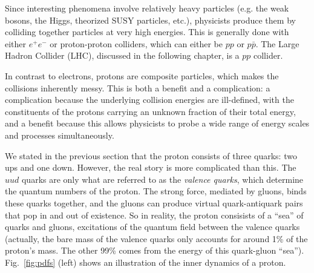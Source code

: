 Since interesting phenomena involve relatively heavy particles (e.g. the weak bosons,
the Higgs, theorized SUSY particles, etc.), physicists produce them by colliding together
particles at very high energies. This is generally done with either $e^+ e^-$ or proton-proton
colliders, which can either be $pp$ or $p\bar{p}$. The Large Hadron Collider (LHC), discussed in the following
chapter, is a $pp$ collider. 

In contrast to electrons, protons are composite particles, which makes the
collisions inherently messy. This is both a benefit and a complication: a complication because
the underlying collision energies are ill-defined, with the constituents of the protons carrying
an unknown fraction of their total energy, and a benefit because this allows physicists to probe
a wide range of energy scales and processes simultaneously.

We stated in the previous section that the proton consists of three quarks: two ups and one down.
However, the real story is more complicated than this. The $uud$ quarks are only what are referred
to as the \textit{valence quarks}, which determine the quantum numbers of the proton. The strong force,
mediated by gluons, binds these quarks together, and the gluons can produce virtual quark-antiquark
pairs that pop in and out of existence. So in reality, the proton consisists of a ``sea'' of quarks
and gluons, excitations of the quantum field between the valence quarks (actually, the bare mass of the
valence quarks only accounts for around 1\% of the proton's mass. The other 99\% comes from the energy
of this quark-gluon ``sea''). Fig.~\ref{fig:pdfs} (left) shows an illustration of the inner dynamics
of a proton.

